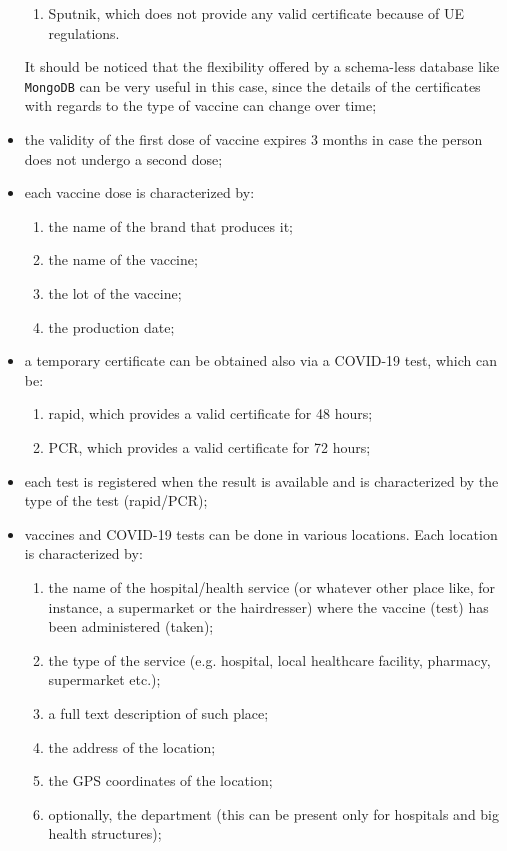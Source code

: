 \documentclass{article}
\begin{document}
\begin{itemize}
\begin{enumerate}
   \item Sputnik, which does not provide any valid certificate because of UE regulations.
\end{enumerate}
It should be noticed that the flexibility offered by a schema-less database like \verb|MongoDB| can be very useful in this case, since the details of the certificates with regards to the type of vaccine can change over time;
\item the validity of the first dose of vaccine expires 3 months in case the person does not undergo a second dose;
\item each vaccine dose is characterized by:
\begin{enumerate}
    \item the name of the brand that produces it;
    \item the name of the vaccine;
    \item the lot of the vaccine;
    \item the production date;
\end{enumerate}
\item a temporary certificate can be obtained also via a COVID-19 test, which can be:
\begin{enumerate}
    \item rapid, which provides a valid certificate for 48 hours;
    \item PCR, which provides a valid certificate for 72 hours;
    \end{enumerate}
\item each test is registered when the result is available and is characterized by the type of the test (rapid/PCR);
\item vaccines and COVID-19 tests can be done in various locations. Each location is characterized by:
\begin{enumerate}
    \item the name of the hospital/health service (or whatever other place like, for instance, a supermarket or the hairdresser) where the vaccine (test) has been administered (taken);
    \item the type of the service (e.g. hospital, local healthcare facility, pharmacy, supermarket etc.);
    \item a full text description of such place;
    \item the address of the location;
    \item the GPS coordinates of the location;
    \item optionally, the department (this can be present only for hospitals and big health structures);

\end{enumerate}
\end{itemize}
\end{document}
